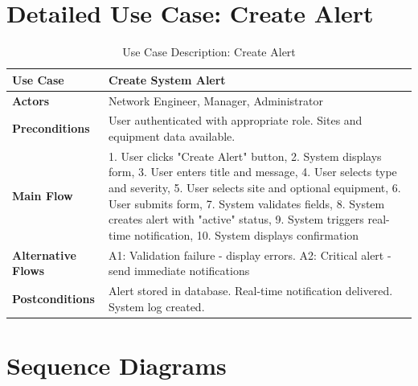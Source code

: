 \section{Detailed Use Case: Create Alert}

\begin{table}[htbp]
\centering
\caption{Use Case Description: Create Alert}
\small
\begin{tabular}{|p{3.5cm}|p{10cm}|}
\hline
\textbf{Use Case} & Create System Alert \\
\hline
\textbf{Actors} & Network Engineer, Manager, Administrator \\
\hline
\textbf{Preconditions} & User authenticated with appropriate role. Sites and equipment data available. \\
\hline
\textbf{Main Flow} & 1. User clicks "Create Alert" button, 2. System displays form, 3. User enters title and message, 4. User selects type and severity, 5. User selects site and optional equipment, 6. User submits form, 7. System validates fields, 8. System creates alert with "active" status, 9. System triggers real-time notification, 10. System displays confirmation \\
\hline
\textbf{Alternative Flows} & A1: Validation failure - display errors. A2: Critical alert - send immediate notifications \\
\hline
\textbf{Postconditions} & Alert stored in database. Real-time notification delivered. System log created. \\
\hline
\end{tabular}
\end{table}

\section{Sequence Diagrams}

